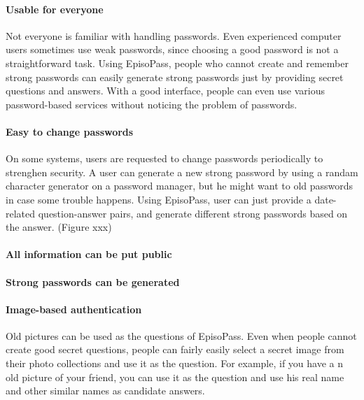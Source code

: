 \documentclass{article}
\begin{document}
\paragraph{Usable for everyone}
  

Not everyone is familiar with handling passwords.
Even experienced computer users sometimes use weak passwords,
since choosing a good password is not a straightforward task.
Using EpisoPass, people who cannot create and remember strong passwords
can easily generate strong passwords just by providing secret
questions and answers.
With a good interface, people can even use various password-based
services without noticing the problem of passwords.


\paragraph{Easy to change passwords}


On some systems, users are requested to change passwords periodically
to strenghen security.
A user can generate a new strong password by using a randam character generator
on a password manager, but he might want to old passwords in case some trouble happens.
Using EpisoPass, user can just provide a date-related question-answer pairs,
and generate different strong passwords based on the answer.
(Figure xxx)

\paragraph{All information can be put public}

\paragraph{Strong passwords can be generated}

\paragraph{Image-based authentication}

Old pictures can be used as the questions of EpisoPass.
Even when people cannot create good secret questions,
people can fairly easily select a secret image from their photo collections
and use it as the question.
For example, if you have a n old picture of your friend,
you can use it as the question
and use his real name and other similar names as candidate answers.
\end{document}
